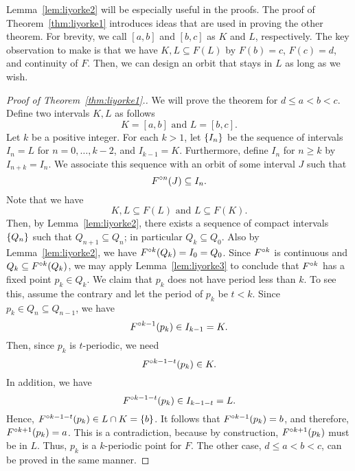 \documentclass[12pt,draft,twoside]{book}
\begin{document}
Lemma~\ref{lem:liyorke2} will be especially useful in the proofs.
The proof of Theorem~\ref{thm:liyorke1} introduces ideas that are used in proving the other theorem.
For brevity, we call $[a,b]$ and $[b,c]$ as $K$ and $L$, respectively.
The key observation to make is that we have $K,L \subseteq F(L)$ by $F(b) = c$, $F(c) = d$, and continuity of $F$.
Then, we can design an orbit that stays in $L$ as long as we wish.

\begin{proof}[Proof of Theorem~\ref{thm:liyorke1}.]
  We will prove the theorem for $d \leq a < b < c$.
  Define two intervals $K,L$ as follows
  \begin{equation*}
    K = [a,b] \mbox{ and } L = [b,c].
  \end{equation*}
  Let $k$ be a positive integer.
  For each $k > 1$, let $\left \{ I_n \right \}$ be the sequence of intervals $I_n = L$ for $n = 0, \ldots, k-2$, and $I_{k-1} = K$.
  Furthermore, define $I_n$ for $n \geq k$ by $I_{n+k} = I_n$.
  We associate this sequence with an orbit of some interval $J$ such that
  \begin{equation*}
    F^{\circ n}(J) \subseteq I_n.
  \end{equation*}
  Note that we have 
  \begin{equation*}
    K,L \subseteq F(L) \mbox{ and } L \subseteq F(K).
  \end{equation*}
  Then, by Lemma~\ref{lem:liyorke2}, there exists a sequence of compact intervals $\left \{ Q_n \right \}$ such that $Q_{n+1} \subseteq Q_{n}$; in particular $Q_k \subseteq Q_0$.
  Also by Lemma~\ref{lem:liyorke2}, we have $F^{\circ k}(Q_k) = I_0 = Q_0$.
  Since $F^{\circ k}$ is continuous and $Q_k \subseteq F^{\circ k}(Q_k)$, we may apply Lemma~\ref{lem:liyorke3} to conclude that $F^{\circ k}$ has a fixed point $p_k \in Q_k$.
  We claim that $p_k$ does not have period less than $k$.
  To see this, assume the contrary and let the period of $p_k$ be $t < k$.
  Since $p_k \in Q_n \subseteq Q_{n-1}$, we have 
  \begin{equation*}
    F^{\circ k-1}(p_k) \in I_{k-1} = K.
  \end{equation*}
  Then, since $p_k$ is $t$-periodic, we need 
  \begin{equation*}
    F^{\circ k-1-t}(p_k) \in K.
  \end{equation*}
  In addition, we have
  \begin{equation*}
    F^{\circ k-1-t}(p_k) \in I_{k-1-t} = L.
  \end{equation*}
  Hence, $F^{\circ k-1-t}(p_k) \in L \cap K = \left \{ b \right \}$.
  It follows that $F^{\circ k-1}(p_k) = b$, and therefore, $F^{\circ k+1}(p_k) = a$.
  This is a contradiction, because by construction, $F^{\circ k+1}(p_k)$ must be in $L$.
  Thus, $p_k$ is a $k$-periodic point for $F$.
  The other case, $d \leq a < b < c$, can be proved in the same manner.
\end{proof}
\end{document}
